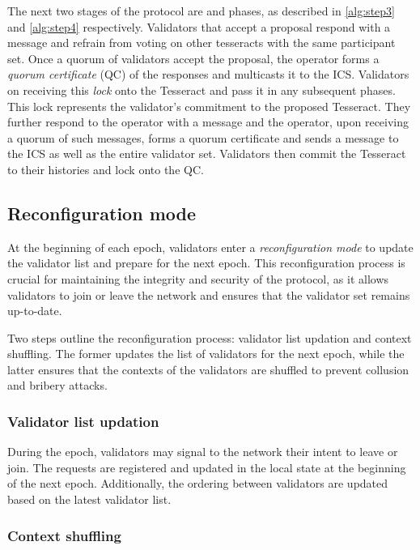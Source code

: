 The next two stages of the protocol are  and  phases, as described in \cref{alg:step3} and \cref{alg:step4} respectively. Validators that accept a proposal respond with a  message and refrain from voting on other tesseracts with the same participant set. Once a quorum of validators accept the proposal, the operator forms a \emph{quorum certificate} (QC) of the  responses and multicasts it to the ICS. Validators on receiving this \emph{lock} onto the Tesseract and pass it in any subsequent  phases. This lock represents the validator's commitment to the proposed Tesseract. 
They further respond to the operator with a  message and the operator, upon receiving a quorum of such messages, forms a quorum certificate and sends a  message to the ICS as well as the entire validator set. 
Validators then commit the Tesseract to their histories and lock onto the QC. 

\subsection{Reconfiguration mode}

At the beginning of each epoch, validators enter a \emph{reconfiguration mode} to update the validator list and prepare for the next epoch. This reconfiguration process is crucial for maintaining the integrity and security of the protocol, as it allows validators to join or leave the network and ensures that the validator set remains up-to-date.

Two steps outline the reconfiguration process: validator list updation and context shuffling. The former updates the list of validators for the next epoch, while the latter ensures that the contexts of the validators are shuffled to prevent collusion and bribery attacks.

\subsubsection{Validator list updation}

During the epoch, validators may signal to the network their intent to leave or join. The requests are registered and updated in the local state at the beginning of the next epoch. Additionally, the ordering between validators are updated based on the latest validator list.

\subsubsection{Context shuffling}

